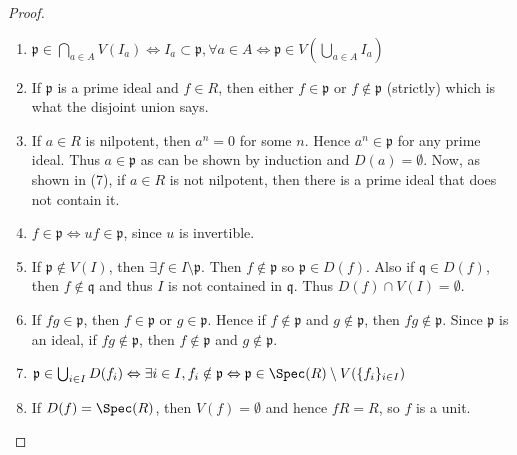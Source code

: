 \begin{proof}
\begin{enumerate}
$I \cap J \subset \mathfrak{p}$, then $IJ \subset \mathfrak{p}$ and hence
either $I \subset \mathfrak{p}$ or $J \subset \mathfrak{p}$, since $\mathfrak{p}$ is prime.
\item $\mathfrak{p} \in \bigcap_{a \in A} V(I_a) \Leftrightarrow
I_a \subset \mathfrak{p}, \forall a \in A \Leftrightarrow
\mathfrak{p} \in V(\bigcup_{a\in A} I_a)$
\item If $\mathfrak{p}$ is a prime ideal and $f \in R$, then either $f \in
\mathfrak{p}$ or $f \notin \mathfrak{p}$ (strictly) which is what the disjoint
union says.
\item If $a \in R$ is nilpotent, then $a^n = 0$ for some $n$. Hence $a^n \in
\mathfrak{p}$ for any prime ideal. Thus $a \in \mathfrak{p}$ as can be shown by
induction and $D(a) = \emptyset$. Now, as shown in (7), if $a \in R$ is not
nilpotent, then there is a prime ideal that does not contain it.
\item $f \in \mathfrak{p} \Leftrightarrow uf \in \mathfrak{p}$, since $u$ is
invertible.
\item If $\mathfrak{p} \notin V(I)$, then $\exists f \in I \setminus
\mathfrak{p}$. Then $f \notin \mathfrak{p}$ so $\mathfrak{p} \in D(f)$. Also if
$\mathfrak{q} \in D(f)$, then $f \notin \mathfrak{q}$ and thus $I$ is not
contained in $\mathfrak{q}$. Thus $D(f) \cap V(I) = \emptyset$.
\item If $fg \in \mathfrak{p}$, then $f \in \mathfrak{p}$ or $g \in
\mathfrak{p}$. Hence if $f \notin \mathfrak{p}$ and $g \notin \mathfrak{p}$,
then $fg \notin \mathfrak{p}$. Since $\mathfrak{p}$ is an ideal, if $fg \notin
\mathfrak{p}$, then $f \notin \mathfrak{p}$ and $g \notin \mathfrak{p}$.
\item $\mathfrak{p} \in \bigcup_{i \in I} D(f_i) \Leftrightarrow \exists i \in
I, f_i \notin \mathfrak{p} \Leftrightarrow \mathfrak{p} \in \Spec(R)
\setminus V(\{f_i\}_{i \in I})$
\item If $D(f) = \Spec(R)$, then $V(f) = \emptyset$ and
hence $fR = R$, so $f$ is a unit.
\end{enumerate}
\end{proof}